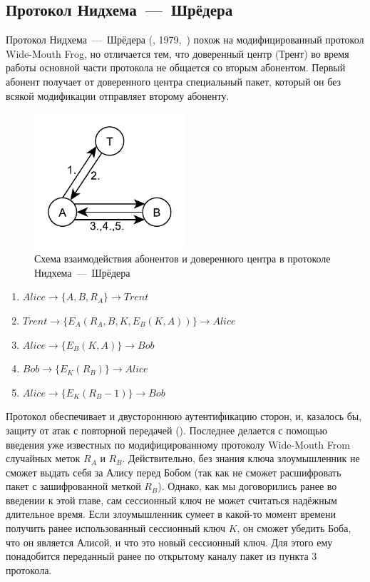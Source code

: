 \subsection{Протокол Нидхема~---~Шрёдера}

Протокол Нидхема~---~Шрёдера (, 1979,~\cite{Needham:Schroeder:1978}) похож на модифицированный протокол Wide-Mouth Frog, но отличается тем, что доверенный центр (Трент) во время работы основной части протокола не общается со вторым абонентом. Первый абонент получает от доверенного центра специальный пакет, который он без всякой модификации отправляет второму абоненту.

\begin{figure}[!htb]
    \centering
    \includegraphics[width=0.5\textwidth]{pic/key_distribution-needham-schroeder}
    \caption{Схема взаимодействия абонентов и доверенного центра в протоколе Нидхема~---~Шрёдера\label{fig:key_distribution-needham-schroeder}}
\end{figure}

\begin{enumerate}
	\item $ Alice	\rightarrow \{ A, B, R_A \}						\rightarrow Trent $
	\item $ Trent	\rightarrow \{ E_A \left( R_A, B, K, E_B \left( K, A \right) \right) \}	\rightarrow Alice $
	\item $ Alice	\rightarrow \{ E_B \left( K, A \right) \}				\rightarrow Bob $
	\item $ Bob	\rightarrow \{ E_K \left( R_B \right) \}				\rightarrow Alice $
	\item $ Alice	\rightarrow \{ E_K \left( R_B - 1 \right) \}				\rightarrow Bob $
\end{enumerate}

Протокол обеспечивает и двустороннюю аутентификацию сторон, и, казалось бы, защиту от атак с повторной передачей (). Последнее делается с помощью введения уже известных по модифицированному протоколу Wide-Mouth From случайных меток $R_A$ и $R_B$. Действительно, без знания ключа злоумышленник не сможет выдать себя за Алису перед Бобом (так как не сможет расшифровать пакет с зашифрованной меткой $R_B$). Однако, как мы договорились ранее во введении к этой главе, сам сессионный ключ не может считаться надёжным длительное время. Если злоумышленник сумеет в какой-то момент времени получить ранее использованный сессионный ключ $K$, он сможет убедить Боба, что он является Алисой, и что это новый сессионный ключ. Для этого ему понадобится переданный ранее по открытому каналу пакет из пункта 3 протокола.

